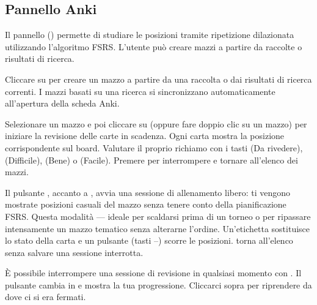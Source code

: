 \documentclass[letterpaper,10pt,italian]{sphinxmanual}
\begin{document}
\subsection{Pannello Anki}
\label{\detokenize{manuel:panneau-anki}}\label{\detokenize{manuel:id10}}
\sphinxAtStartPar
Il pannello  () permette di studiare le posizioni tramite ripetizione dilazionata utilizzando l’algoritmo FSRS. L’utente può creare mazzi a partire da raccolte o risultati di ricerca.

\sphinxAtStartPar
{} Cliccare su  per creare un mazzo a partire da una raccolta o dai risultati di ricerca correnti. I mazzi basati su una ricerca si sincronizzano automaticamente all’apertura della scheda Anki.

\sphinxAtStartPar
{} Selezionare un mazzo e poi cliccare su  (oppure fare doppio clic su un mazzo) per iniziare la revisione delle carte in scadenza. Ogni carta mostra la posizione corrispondente sul board. Valutare il proprio richiamo con i tasti  (Da rivedere),  (Difficile),  (Bene) o  (Facile). Premere  per interrompere e tornare all’elenco dei mazzi.

\sphinxAtStartPar
{} Il pulsante , accanto a , avvia una sessione di allenamento libero: ti vengono mostrate posizioni casuali del mazzo senza tenere conto della pianificazione FSRS. Questa modalità  — ideale per scaldarsi prima di un torneo o per ripassare intensamente un mazzo tematico senza alterarne l’ordine. Un’etichetta  sostituisce lo stato della carta e un pulsante  (tasti –) scorre le posizioni.  torna all’elenco senza salvare una sessione interrotta.

\sphinxAtStartPar
{} È possibile interrompere una sessione di revisione in qualsiasi momento con . Il pulsante cambia in  e mostra la tua progressione. Cliccarci sopra per riprendere da dove ci si era fermati.
\end{document}
